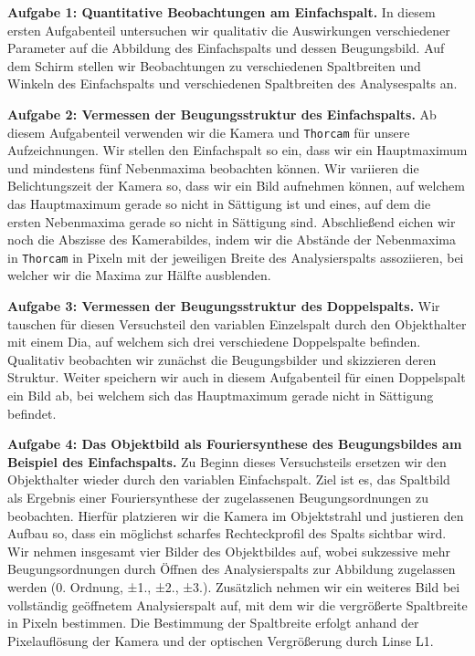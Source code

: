 \textbf{Aufgabe 1: Quantitative Beobachtungen am Einfachspalt.} In diesem ersten Aufgabenteil untersuchen wir qualitativ die Auswirkungen verschiedener Parameter auf die Abbildung des Einfachspalts und dessen Beugungsbild. Auf dem Schirm stellen wir Beobachtungen zu verschiedenen Spaltbreiten und Winkeln des Einfachspalts und verschiedenen Spaltbreiten des Analysespalts an.

\textbf{Aufgabe 2: Vermessen der Beugungsstruktur des Einfachspalts.} Ab diesem Aufgabenteil verwenden wir die Kamera und \texttt{Thorcam} für unsere Aufzeichnungen. Wir stellen den Einfachspalt so ein, dass wir ein Hauptmaximum und mindestens fünf Nebenmaxima beobachten können. Wir variieren die Belichtungszeit der Kamera so, dass wir ein Bild aufnehmen können, auf welchem das Hauptmaximum gerade so nicht in Sättigung ist und eines, auf dem die ersten Nebenmaxima gerade so nicht in Sättigung sind. Abschließend eichen wir noch die Abszisse des Kamerabildes, indem wir die Abstände der Nebenmaxima in \texttt{Thorcam} in Pixeln mit der jeweiligen Breite des Analysierspalts assoziieren, bei welcher wir die Maxima zur Hälfte ausblenden.


\textbf{Aufgabe 3: Vermessen der Beugungsstruktur des Doppelspalts.} Wir tauschen für diesen Versuchsteil den variablen Einzelspalt durch den Objekthalter mit einem Dia, auf welchem sich drei verschiedene Doppelspalte befinden. Qualitativ beobachten wir zunächst die Beugungsbilder und skizzieren deren Struktur. Weiter speichern wir auch in diesem Aufgabenteil für einen Doppelspalt ein Bild ab, bei welchem sich das Hauptmaximum gerade nicht in Sättigung befindet.

\textbf{Aufgabe 4: Das Objektbild als Fouriersynthese des Beugungsbildes am Beispiel des Einfachspalts.} Zu Beginn dieses Versuchsteils ersetzen wir den Objekthalter wieder durch den variablen Einfachspalt. Ziel ist es, das Spaltbild als Ergebnis einer Fouriersynthese der zugelassenen Beugungsordnungen zu beobachten. Hierfür platzieren wir die Kamera im Objektstrahl und justieren den Aufbau so, dass ein möglichst scharfes Rechteckprofil des Spalts sichtbar wird. Wir nehmen insgesamt vier Bilder des Objektbildes auf, wobei sukzessive mehr Beugungsordnungen durch Öffnen des Analysierspalts zur Abbildung zugelassen werden (0. Ordnung, ±1., ±2., ±3.). Zusätzlich nehmen wir ein weiteres Bild bei vollständig geöffnetem Analysierspalt auf, mit dem wir die vergrößerte Spaltbreite in Pixeln bestimmen. Die Bestimmung der Spaltbreite erfolgt anhand der Pixelauflösung der Kamera und der optischen Vergrößerung durch Linse L1.

